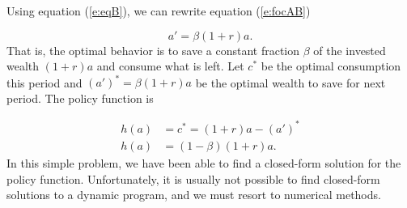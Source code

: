 \documentclass{article}
\begin{document}
Using equation (\ref{e:eqB}), we can rewrite equation (\ref{e:focAB})

\[
a'=\beta (1+r) a.
\]
That is, the optimal behavior is to save a constant fraction $\beta$ of the invested wealth $(1+r) a$ and consume what is left. Let $c^{*}$ be the optimal consumption this period and $(a')^*=\beta (1+r) a $ be the optimal wealth to save for next period. The policy function is

\[
\begin{align*}
h(a)&=c^*=(1+r) a-(a')^*\\
h(a)&=(1-\beta) (1+r) a.
\end{align*}
\]
In this simple problem, we have been able to find a closed-form solution for the policy function. Unfortunately, it is usually not possible to find closed-form solutions to a dynamic program, and we must resort to numerical methods. 
\end{document}

